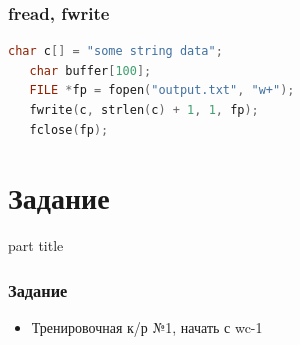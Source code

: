 \documentclass[14pt,pdf,hyperref={unicode}]{beamer}
\begin{document}
\begin{frame}[fragile]
\frametitle{fread, fwrite}  
\begin{lstlisting}[language=C++,basicstyle=\ttfamily,keywordstyle=\color{blue},stringstyle=\color{orange}\ttfamily]
   char c[] = "some string data";
   char buffer[100];
   FILE *fp = fopen("output.txt", "w+");
   fwrite(c, strlen(c) + 1, 1, fp);
   fclose(fp);
\end{lstlisting}
\end{frame}





\section{Задание}
\begin{frame}
\begin{center}
\begin{beamercolorbox}[sep=8pt,center]{part
title}
\insertsection
\end{beamercolorbox}
\end{center}
\end{frame}

\begin{frame}[fragile]
\frametitle{Задание} 
\begin{itemize}
\item Тренировочная к/р №1, начать с wc-1
\end{itemize}
\end{frame}
\end{document}
